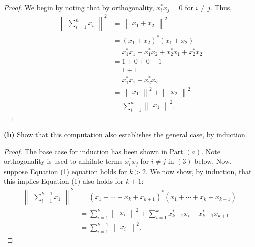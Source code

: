 \documentclass{article}
\begin{document}
\begin{proof}
    
We begin by noting that by orthogonality, $x_i^* x_j = 0$ for $i \neq j$. Thus,
\begin{align*}
    \begin{Vmatrix}\displaystyle
        \sum_{i=1}^n x_i
    \end{Vmatrix}^2 &=     \begin{Vmatrix}
    x_1 + x_2
\end{Vmatrix}^2\\
 &= (x_1 + x_2)^*(x_1 + x_2)\\
 &= x_1^*x_1 + x_1^*x_2 + x_2^* x_1 + x_2^*x_2\\
 &= 1 + 0 + 0 + 1\\
 &= 1 + 1\\
 &= x_1^*x_1 + x_2^*x_2\\
 &= \begin{Vmatrix}
    x_1
 \end{Vmatrix}^2 + \begin{Vmatrix}
    x_2
 \end{Vmatrix}^2\\
 &= \sum_{i=1}^n \begin{Vmatrix}
    x_1
 \end{Vmatrix}^2.
\end{align*}
\end{proof} 
\textbf{(b)} Show that this computation also establishes the general case, by induction.
\begin{proof}
    The base case for induction has been shown in Part $(a)$. Note orthogonality is used to anhilate terms $x_i^*x_j$ for $i \neq j$ in $(3)$ below. Now, suppose Equation (1) equation holds for $k > 2$. We now show, by induction, that this implies Equation (1) also holds for $k+1$:
    \begin{align}
        \begin{Vmatrix}
            \sum_{i=1}^{k+1}x_1
        \end{Vmatrix}^2 &= (x_1 + \cdots + x_k + x_{k+1})^*(x_1 + \cdots + x_k + x_{k+1})\\
        &= \sum_{i=1}^k \begin{Vmatrix}
            x_i
        \end{Vmatrix}^2 + \sum_{i=1}^kx_{k+1}^*x_i + x_{k+1}^*x_{k+1}\\
        &= \sum_{i=1}^{k+1}\begin{Vmatrix}
            x_i
        \end{Vmatrix}^2.
    \end{align}
\end{proof}
\end{document}

